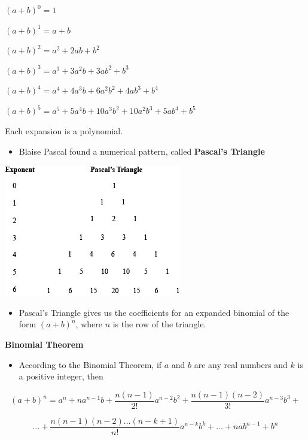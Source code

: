 \documentclass[]{book}
\providecommand{\tightlist}{%
  \setlength{\itemsep}{0pt}\setlength{\parskip}{0pt}}
\begin{document}
\((a+b)^0 = 1\)

\((a+b)^1 = a+b\)

\((a+b)^2 = a^2+2ab+b^2\)

\((a+b)^3 = a^3+3a^2b+3ab^2+b^3\)

\((a+b)^4 = a^4+4a^3b+6a^2b^2+4ab^3+b^4\)

\((a+b)^5 = a^5+5a^4b+10a^3b^2+10a^2b^3+5ab^4+b^5\)

Each expansion is a polynomial.

\begin{itemize}
\tightlist
\item
  Blaise Pascal found a numerical pattern, called \textbf{Pascal's Triangle}
\end{itemize}

\begin{center}\includegraphics[width=0.7\linewidth]{figure/5Derivatives-12} \end{center}

\begin{itemize}
\tightlist
\item
  Pascal's Triangle gives us the coefficients for an expanded binomial of the form \((a + b)^n\), where \(n\) is the row of the triangle.
\end{itemize}

\textbf{Binomial Theorem}

\begin{itemize}
\tightlist
\item
  According to the Binomial Theorem, if \(a\) and \(b\) are any real numbers and \(k\) is a positive integer, then
\end{itemize}

\[(a+b)^n = a^n + na^{n-1}b+\frac{n(n-1)}{2!}a^{n-2}b^2+
  \frac{n(n-1)(n-2)}{3!}a^{n-3}b^3 +\]

\[\dots + \frac{n(n-1)(n-2)\dots (n-k+1)}{n!}a^{n-k}b^k + \dots + nab^{n-1}+b^n\]
\end{document}
